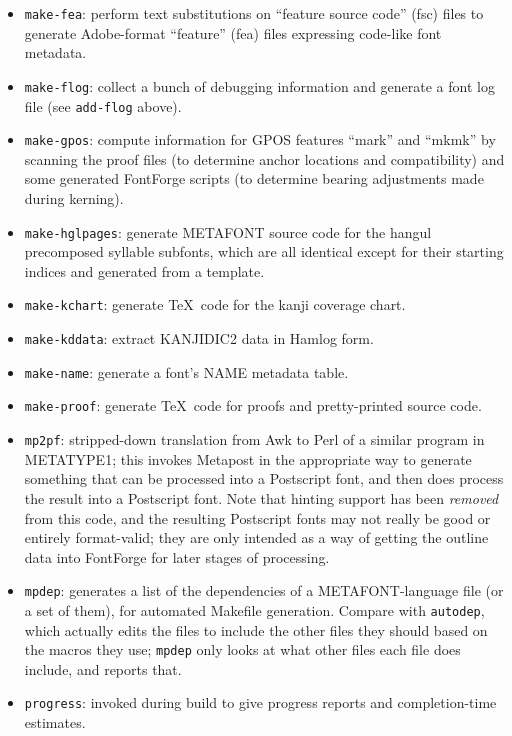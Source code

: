 \documentclass[14pt]{extarticle}
\begin{document}
\begin{itemize}
\item \texttt{make-fea}: perform text substitutions on ``feature source
code'' (fsc) files to generate Adobe-format ``feature'' (fea) files
expressing code-like font metadata.

\item \texttt{make-flog}: collect a bunch of debugging information and
generate a font log file (see \texttt{add-flog} above).

\item \texttt{make-gpos}: compute information for GPOS features ``mark'' and
``mkmk'' by scanning the proof files (to determine anchor locations and
compatibility) and some generated FontForge scripts (to determine bearing
adjustments made during kerning).

\item \texttt{make-hglpages}: generate METAFONT source code for the hangul
precomposed syllable subfonts, which are all identical except for their
starting indices and generated from a template.

\item \texttt{make-kchart}: generate \TeX\ code for the kanji coverage
chart.

\item \texttt{make-kddata}: extract KANJIDIC2 data in Hamlog form.

\item \texttt{make-name}: generate a font's NAME metadata table.

\item \texttt{make-proof}: generate \TeX\ code for proofs and pretty-printed
source code.

\item \texttt{mp2pf}: stripped-down translation from Awk to Perl of a
similar program in METATYPE1; this invokes Metapost in the appropriate way
to generate something that can be processed into a Postscript font, and then
does process the result into a Postscript font.  Note that hinting support
has been \emph{removed} from this code, and the resulting Postscript fonts
may not really be good or entirely format-valid; they are only intended as a
way of getting the outline data into FontForge for later stages of
processing.

\item \texttt{mpdep}: generates a list of the dependencies of a
METAFONT-language file (or a set of them), for automated Makefile generation. 
Compare with \texttt{autodep}, which actually edits the files to include the
other files they should based on the macros they use; \texttt{mpdep} only
looks at what other files each file does include, and reports that.

\item \texttt{progress}: invoked during build to give progress reports and
completion-time estimates.

\end{itemize}
\end{document}
